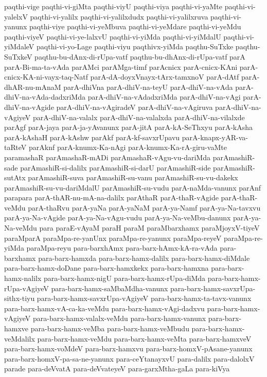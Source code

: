 {paqthi-vige
paqthi-vi-giMta
paqthi-viyU
paqthi-viya
paqthi-vi-yaMte
paqthi-vi-yalelxV
paqthi-vi-yalilx
paqthi-vi-yalilxdudx
paqthi-vi-yalilxruva
paqthi-vi-yanunx
paqthi-viye
paqthi-vi-yeMbuva
paqthi-vi-yeMdare
paqthi-vi-yeMdu
paqthi-viyeV
paqthi-vi-ye-lalxvU
paqthi-vi-yiMda
paqthi-vi-yiMdalU
paqthi-vi-yiMdaleV
paqthi-vi-yo-Lage
paqthi-viyu
paqthivx-yiMda
paqthu-SuTxke
paqthu-SuTxkeV
paqthu-bu-dAnx-di-rUpa-vatf
paqthu-bu-dhAnx-di-rUpa-vatf
parA
parA-Bi-ma-ta-vAda
parAMci
parAMga-timf
parAcnicx
parA-cnicx-KAni
parA-cnicx-KA-ni-vayx-taq-Natf
parA-dA-doyxVnayx-tArx-tamxnoV
parA-dAtf
parA-dhAR-nu-mAnaM
parA-dhiVna
parA-dhiV-na-teyU
parA-dhiV-na-vAda
parA-dhiV-na-vAda-dadxriMda
parA-dhiV-na-vAdadxriMda
parA-dhiV-na-vAgi
parA-dhiV-na-vAgide
parA-dhiV-na-vAgiradeV
parA-dhiV-na-vAgiruva
parA-dhiV-na-vAgiyeV
parA-dhiV-na-valalx
parA-dhiV-na-valalxda
parA-dhiV-na-vilalxde
parAgf
parA-jaya
parA-ja-yAvanunx
parA-jitA
parA-kA-SeThxyu
parA-kAsha
parA-kAshaH
parA-kAshw
parAkf
parA-kf-savxrUpavu
parA-knapx-yAR-va-taRteV
parAknf
parA-knumx-Ka-nAgi
parA-knumx-Ka-rA-giru-vaMte
paramashaR
parAmashaR-mADi
parAmashaR-vAgu-vu-dariMda
parAmashiR-sade
parAmashiR-si-dalilx
parAmashiR-si-darU
parAmashiR-side
parAmashiR-sutAtx
parAmashiR-suva
parAmashiR-su-vanu
parAmashiR-su-vu-dakekx
parAmashiR-su-vu-dariMdalU
parAmashiR-su-vudu
parA-naMda-vanunx
parAnf
parapara
parA-thAR-nu-mA-na-dalilx
parAthaR
parA-thaR-vAgide
parA-thaR-veMdu
parA-thaRvu
parA-yaNa
parA-yaNaM
parA-ya-Namf
parA-ya-Na-tavxvu
parA-ya-Na-vAgide
parA-ya-Na-vAgu-vudu
parA-ya-Na-veMbu-danunx
parA-ya-Na-veMdu
para
paraE-vAyaM
paraH
paraM
paraMbarxhamx
paraMjoyxV-tiyeV
paraMparA
paraMpa-re-yanUnx
paraMpa-re-yanunx
paraMpa-reyeV
paraMpa-re-yiMda
paraMpa-reyu
para-barxhAmx
para-barx-hAmx-kA-ra-vAda
para-barxhamx
para-barx-hamxda
para-barx-hamx-dalilx
para-barx-hamx-diMdale
para-barx-hamx-doDane
para-barx-hamxkekx
para-barx-hamxna
para-barx-hamx-nalilx
para-barx-hamx-nigU
para-barx-hamx-rUpa-diMda
para-barx-hamx-rUpa-vAgiyeV
para-barx-hamx-saMbaMdha-vanunx
para-barx-hamx-savxrUpa-sithx-tiyu
para-barx-hamx-savxrUpa-vAgiyeV
para-barx-hamx-ta-tavx-vanunx
para-barx-hamx-vA-ca-ka-veMdu
para-barx-hamx-vAgi-dadxvu
para-barx-hamx-vAgiyeV
para-barx-hamx-valalx-veMdu
para-barx-hamx-vanunx
para-barx-hamxve
para-barx-hamx-veMba
para-barx-hamx-veMbudu
para-barx-hamx-veMdalilx
para-barx-hamx-veMdu
para-barx-hamx-veMta
para-barx-hamxveV
para-barx-hamx-voMdeV
para-barx-hamxvu
para-barx-homxV-pAsane-yanunx
para-barx-homxV-pa-sa-ne-yanunx
para-ceYtanayxvU
para-dalilx
para-dalolxV
parade
para-deVvatA
para-deVvateyeV
para-garxMtha-gaLa
para-kiVya
}
